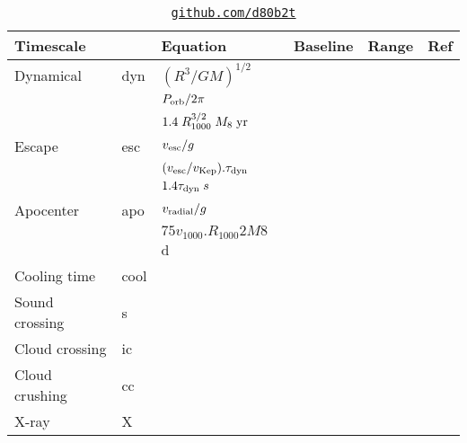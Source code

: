 \documentclass[11pt]{article}
\begin{document}
\newpage


\begin{table}
    \begin{center}
       \begin{tabular}{l l l l l l} 
        \hline
        \hline 
         Timescale   &          & Equation                                                                                                         & Baseline& Range& Ref \\
        \hline  
        \hline 
         Dynamical  & dyn    & $(R^3/GM)^{1/2}$                                            &   & & \\
                            &          & $P_{\rm orb}/2\pi$                                            &   & & \\
                            &          & $1.4 \; R_{1000}^{3/2} \; M_{8} \; {\rm yr}$         &   & & \\
           Escape        &  esc &  $v_{\rm esc} / g$                                              & & & \\
                              &         & $(v_{\rm esc} / v_{\rm Kep}) . \tau_{\rm dyn} $       & & & \\
                            &           & $1.4 \tau_{\rm dyn} \; s $                                 & & & \\
         Apocenter   & apo   & $v_{\rm radial}/g$     & & & \\
                            &         &   $75 v_{1000}. R_{1000} 2 M8$ d & & & \\ 
         Cooling time      & cool  &    & & & \\
         Sound crossing  &  s      &    & & & \\
         Cloud crossing  &  ic      &    & & & \\
        Cloud crushing  & cc       &     & & & \\
         X-ray                 & X       &    & & & \\
         \hline
         \hline 
       \end{tabular}
      \caption{\href{https://github.com/d80b2t}{\tt github.com/d80b2t}}
    \end{center}
\end{table}
\end{document}
